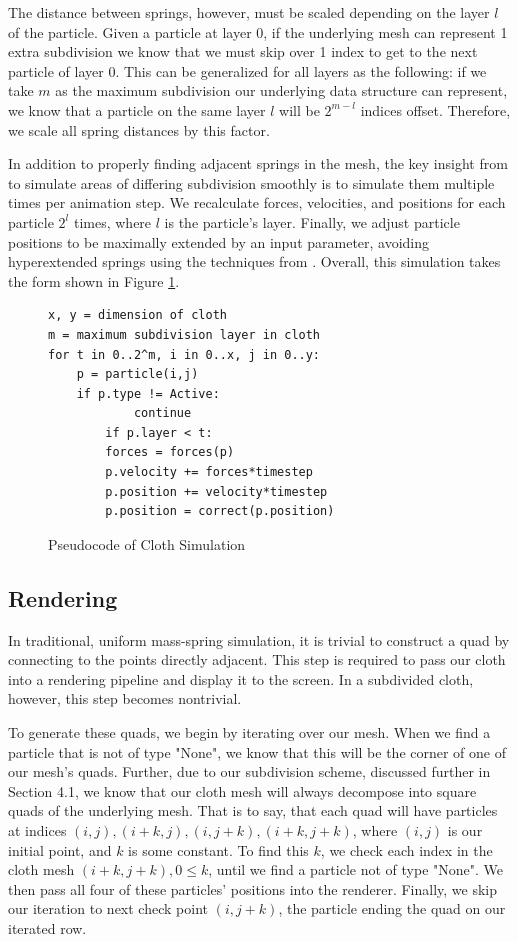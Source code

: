\documentclass[sigconf]{acmart}
\begin{document}
The distance between springs, however, must be scaled depending on the layer $l$ of the particle. Given a particle at layer 0, if the underlying mesh can represent 1 extra subdivision we know that we must skip over 1 index to get to the next particle of layer 0. This can be generalized for all layers as the following: if we take $m$ as the maximum subdivision our underlying data structure can represent, we know that a particle on the same layer $l$ will be $2^{m-l}$ indices offset. Therefore, we scale all spring distances by this factor.

In addition to properly finding adjacent springs in the mesh, the key insight from \cite{hutchinson} to simulate areas of differing subdivision smoothly is to simulate them multiple times per animation step. We recalculate forces, velocities, and positions for each particle $2^{l}$ times, where $l$ is the particle's layer. Finally, we adjust particle positions to be maximally extended by an input parameter, avoiding hyperextended springs using the techniques from \cite{provot}. Overall, this simulation takes the form shown in Figure \ref{fig:sim}.
\begin{figure}
\begin{Verbatim}
x, y = dimension of cloth
m = maximum subdivision layer in cloth
for t in 0..2^m, i in 0..x, j in 0..y:
	p = particle(i,j)
	if p.type != Active:
            continue
        if p.layer < t:
		forces = forces(p)
		p.velocity += forces*timestep
		p.position += velocity*timestep
		p.position = correct(p.position)

\end{Verbatim}
\caption{Pseudocode of Cloth Simulation}
\label{fig:sim}
\end{figure}

\subsection{Rendering}
In traditional, uniform mass-spring simulation, it is trivial to construct a quad by connecting to the points directly adjacent. This step is required to pass our cloth into a rendering pipeline and display it to the screen. In a subdivided cloth, however, this step becomes nontrivial.

To generate these quads, we begin by iterating over our mesh. When we find a particle that is not of type "None", we know that this will be the corner of one of our mesh's quads. Further, due to our subdivision scheme, discussed further in Section 4.1, we know that our cloth mesh will always decompose into square quads of the underlying mesh. That is to say, that each quad will have particles at indices $(i,j), (i+k, j), (i,j+k), (i+k,j+k)$, where $(i,j)$ is our initial point, and $k$ is some constant. To find this $k$, we check each index in the cloth mesh $(i+k,j+k), 0\leq k$, until we find a particle not of type "None". We then pass all four of these particles' positions into the renderer. Finally, we skip our iteration to next check point $(i,j+k)$, the particle ending the quad on our iterated row.
\end{document}
